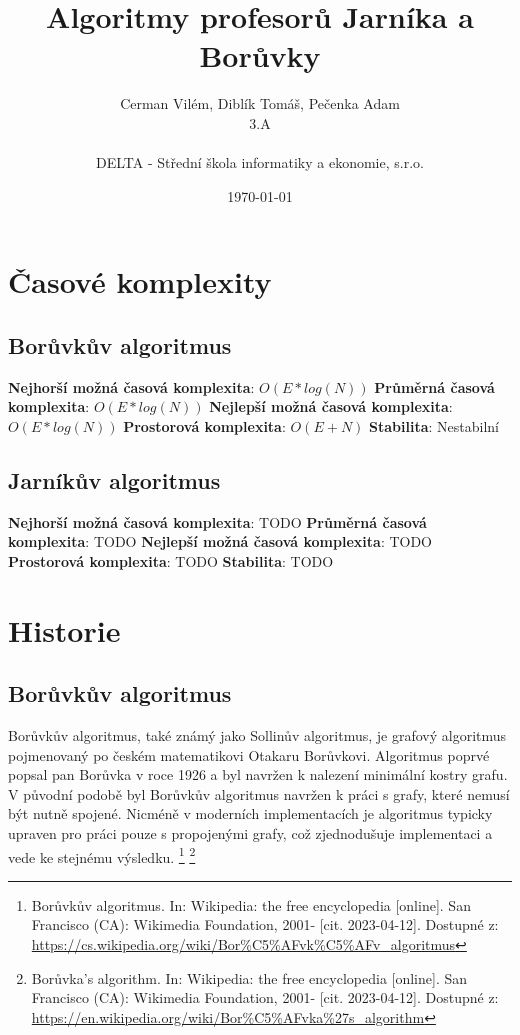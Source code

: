 \documentclass[11pt]{article}
\author{Cerman Vilém, Diblík Tomáš, Pečenka Adam \\ 3.A \\\\ DELTA - Střední škola informatiky a ekonomie, s.r.o.}
\title{Algoritmy profesorů Jarníka a Borůvky}
\date{\selectlanguage{czech}\today}
\begin{document}
\maketitle
\thispagestyle{empty}
\pagebreak

\tableofcontents
\thispagestyle{empty}
\pagebreak

\setcounter{page}{1}
\section{Časové komplexity}

\subsection{Borůvkův algoritmus}

\medbreak
\textbf{Nejhorší možná časová komplexita}: $O(E * log(N))$
\medbreak\noindent
\textbf{Průměrná časová komplexita}: $O(E * log(N))$
\medbreak\noindent
\textbf{Nejlepší možná časová komplexita}: $O(E * log(N))$
\medbreak\noindent
\textbf{Prostorová komplexita}: $O(E + N)$
\medbreak\noindent
\textbf{Stabilita}: Nestabilní
\medbreak

\subsection{Jarníkův algoritmus}

\medbreak
\textbf{Nejhorší možná časová komplexita}: TODO
\medbreak\noindent
\textbf{Průměrná časová komplexita}: TODO
\medbreak\noindent
\textbf{Nejlepší možná časová komplexita}: TODO
\medbreak\noindent
\textbf{Prostorová komplexita}: TODO
\medbreak\noindent
\textbf{Stabilita}: TODO
\medbreak

\pagebreak


\section{Historie}

\subsection{Borůvkův algoritmus}
Borůvkův algoritmus, také známý jako Sollinův algoritmus, je grafový algoritmus pojmenovaný po českém matematikovi Otakaru Borůvkovi. Algoritmus poprvé popsal pan Borůvka v roce 1926 a byl navržen k nalezení minimální kostry grafu. V původní podobě byl Borůvkův algoritmus navržen k práci s grafy, které nemusí být nutně spojené. Nicméně v moderních implementacích je algoritmus typicky upraven pro práci pouze s propojenými grafy, což zjednodušuje implementaci a vede ke stejnému výsledku.
\footnote{Borůvkův algoritmus. In: Wikipedia: the free encyclopedia [online]. San Francisco (CA): Wikimedia Foundation, 2001- [cit. 2023-04-12]. Dostupné z: \url{https://cs.wikipedia.org/wiki/Bor\%C5\%AFvk\%C5\%AFv_algoritmus}}
\footnote{Borůvka's algorithm. In: Wikipedia: the free encyclopedia [online]. San Francisco (CA): Wikimedia Foundation, 2001- [cit. 2023-04-12]. Dostupné z: \url{https://en.wikipedia.org/wiki/Bor\%C5\%AFvka\%27s_algorithm}}
\end{document}
